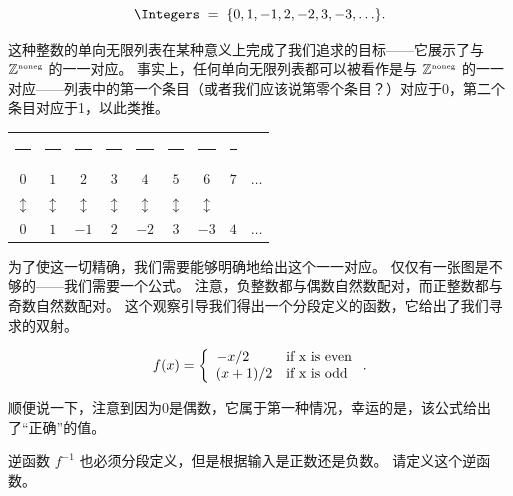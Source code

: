 \[ \Integers \;
    = \; \{0, 1, -1, 2, -2, 3, -3, \ldots \}.
\]

\noindent 这种整数的单向无限列表在某种意义上完成了我们追求的目标——它展示了与 ${\mathbb Z}^{\mbox{\tiny noneg}}$ 的一一对应。
事实上，任何单向无限列表都可以被看作是与 ${\mathbb Z}^{\mbox{\tiny noneg}}$ 的一一对应——列表中的第一个条目（或者我们应该说第零个条目？）对应于0，第二个条目对应于1，以此类推。

\medskip

\begin{tabular}{ccccccccc}
    \rule{32pt}{0pt} & \rule{32pt}{0pt} & \rule{32pt}{0pt} & \rule{32pt}{0pt} & \rule{32pt}{0pt} & \rule{32pt}{0pt} & \rule{32pt}{0pt} & \rule{32pt}{0pt}            \\
    $0$              & $1$              & $2$              & $3$              & $4$              & $5$              & $6$              & $7$              & $\ldots$ \\
    $\updownarrow$   & $\updownarrow$   & $\updownarrow$   & $\updownarrow$   & $\updownarrow$   & $\updownarrow$   & $\updownarrow$   &                             \\
    $0$              & $1$              & $-1$             & $2$              & $-2$             & $3$              & $-3$             & $4$              & $\ldots$ \\
\end{tabular}
\medskip

为了使这一切精确，我们需要能够明确地给出这个一一对应。
仅仅有一张图是不够的——我们需要一个公式。
注意，负整数都与偶数自然数配对，而正整数都与奇数自然数配对。
这个观察引导我们得出一个分段定义的函数，它给出了我们寻求的双射。

\[ f(x) = \left\{ \begin{array}{cl} -x/2 \rule{16pt}{0pt} & \mbox{if x is even} \\
             (x + 1)/2                  & \mbox{if x is odd}\end{array} \right.
    .\]

顺便说一下，注意到因为0是偶数，它属于第一种情况，幸运的是，该公式给出了“正确”的值。

\begin{exer}
    逆函数 $f^{-1}$ 也必须分段定义，但是根据输入是正数还是负数。
    请定义这个逆函数。
\end{exer}


